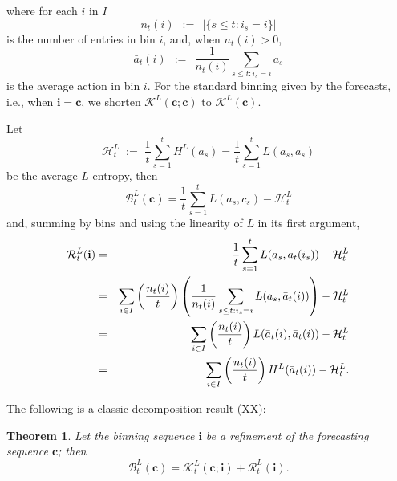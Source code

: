 \documentclass[12pt,a4paper,notitlepage]{article}
\newtheorem{theorem}{Theorem}
\begin{document}
where for each $i$ in $I$%
\begin{equation*}
n_{t}(i)\,%
{\;:=\;}%
\,\left\vert \{s\leq t:i_{s}=i\}\right\vert
\end{equation*}%
is the number of entries in bin $i$, and, when $n_{t}(i)>0$,%
\begin{equation*}
\bar{a}_{t}(i)\,%
{\;:=\;}%
\,\frac{1}{n_{t}(i)}\sum_{s\leq t:i_{s}=i}a_{s}
\end{equation*}%
is the average action in bin $i$. For the standard binning given by the
forecasts, i.e., when $\mathbf{i}=\mathbf{c}$, we shorten $\mathcal{K}^{L}(%
\mathbf{c};\mathbf{c})$ to $\mathcal{K}^{L}(\mathbf{c}).$

Let%
\begin{equation*}
\mathcal{H}_{t}^{L}%
{\;:=\;}%
\frac{1}{t}\sum_{s=1}^{t}H^{L}(a_{s})=\frac{1}{t}\sum_{s=1}^{t}L(a_{s},a_{s})
\end{equation*}%
be the average $L$-entropy, then%
\begin{equation*}
\mathcal{B}_{t}^{L}(\mathbf{c})=\frac{1}{t}\sum_{s=1}^{t}L(a_{s},c_{s})-%
\mathcal{H}_{t}^{L}
\end{equation*}%
and, summing by bins and using the linearity of $L$ in its first argument,%
\begin{eqnarray}
\mathcal{R}_{t}^{L}(\mathbf{i}) &=&\frac{1}{t}\sum_{s=1}^{t}L(a_{s},\bar{a}%
_{t}(i_{s}))-\mathcal{H}_{t}^{L}  \notag \\
&=&\sum_{i\in I}\left( \frac{n_{t}(i)}{t}\right) \left( \frac{1}{n_{t}(i)}%
\sum_{s\leq t:i_{s}=i}L(a_{s},\bar{a}_{t}(i))\right) -\mathcal{H}_{t}^{L} 
\notag \\
&=&\sum_{i\in I}\left( \frac{n_{t}(i)}{t}\right) L(\bar{a}_{t}(i),\bar{a}%
_{t}(i))-\mathcal{H}_{t}^{L}  \notag \\
&=&\sum_{i\in I}\left( \frac{n_{t}(i)}{t}\right) H^{L}(\bar{a}_{t}(i))-%
\mathcal{H}_{t}^{L}.  \label{eq:R-H-H}
\end{eqnarray}

The following is a classic decomposition result (XX):

\begin{theorem}
\label{th:S-decompose}Let the binning sequence $\mathbf{i}$ be a refinement
of the forecasting sequence $\mathbf{c}$; then 
\begin{equation*}
\mathcal{B}_{t}^{L}(\mathbf{c})=\mathcal{K}_{t}^{L}(\mathbf{c};\mathbf{i})+%
\mathcal{R}_{t}^{L}(\mathbf{i}).
\end{equation*}
\end{theorem}
\end{document}
